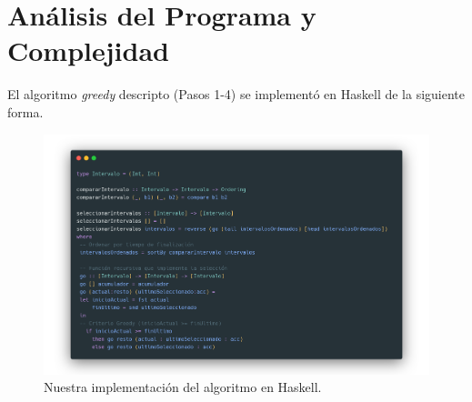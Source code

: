 \documentclass[12pt, a4paper]{article}
\begin{document}
\section{Análisis del Programa y Complejidad}

El algoritmo \textit{greedy} descripto (Pasos 1-4) se implementó en Haskell de la siguiente forma.

\begin{figure}[H]
    \centering
    \includegraphics[width=\linewidth]{carbon.png}
    \caption{Nuestra implementación del algoritmo en Haskell.}
    \label{fig:imagencodigo}
\end{figure}
\end{document}

